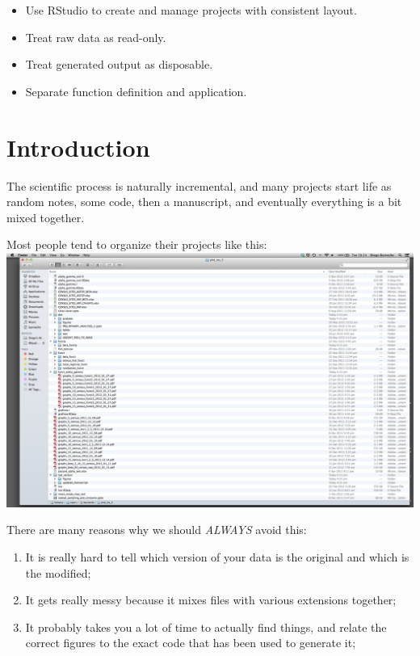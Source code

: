 \documentclass[]{book}
\providecommand{\tightlist}{%
  \setlength{\itemsep}{0pt}\setlength{\parskip}{0pt}}
\begin{document}
\begin{itemize}
\tightlist
\item
  Use RStudio to create and manage projects with consistent layout.\\
\item
  Treat raw data as read-only.\\
\item
  Treat generated output as disposable.\\
\item
  Separate function definition and application.
\end{itemize}

\section{Introduction}\label{introduction}

The scientific process is naturally incremental, and many projects start
life as random notes, some code, then a manuscript, and eventually
everything is a bit mixed together.

Most people tend to organize their projects like this:
\includegraphics{./fig/bad_layout.png}

There are many reasons why we should \emph{ALWAYS} avoid this:

\begin{enumerate}
\def\labelenumi{\arabic{enumi}.}
\tightlist
\item
  It is really hard to tell which version of your data is the original
  and which is the modified;
\item
  It gets really messy because it mixes files with various extensions
  together;
\item
  It probably takes you a lot of time to actually find things, and
  relate the correct figures to the exact code that has been used to
  generate it;
\end{enumerate}
\end{document}
